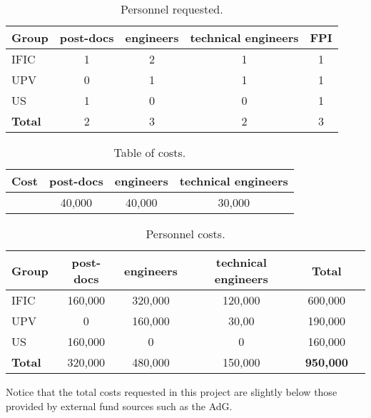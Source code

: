 \begin{table}[h!]
\begin{center}
\begin{tabular}{|l|c|c|c|c|}
\hline
Group &	post-docs	& engineers &	technical engineers & FPI\\
 \hline
IFIC &	1 &	2	&1 &	1\\			
UPV	  & 0	&1 &	1 &	1 \\			
US	& 1 &	0 &	0 &	 1\\			
 \hline
{\bf Total} & 2 & 3 & 2 & 3 \\
 \hline\hline
\end{tabular}  
\caption{Personnel requested.}
\label{tab.P}
\end{center}
\end{table} 

\begin{table}[h!]
\begin{center}
\begin{tabular}{|l|c|c|c|}
\hline
Cost &	post-docs	& engineers &	technical engineers \\
 \hline
 &	40,000 &	40,000	&30,000 \\					
 \hline\hline
\end{tabular}  
\caption{Table of costs.}
\label{tab.new:PT}
\end{center}
\end{table} 

\begin{table}[h!]
\begin{center}
\begin{tabular}{|l|c|c|c|c|c|}
\hline
Group &	post-docs	& engineers &	technical engineers &  Total \\
 \hline
IFIC	&160,000 &	320,000 &	120,000 & 600,000 \\
UPV	 &	0 & 160,000 &	30,00 &	190,000 \\
US	& 160,000 & 0 & 0 &	160,000\\
\hline
{\bf Total} & 320,000 & 480,000 & 150,000 & {\bf 950,000} \\
 \hline\hline
\end{tabular}  
\caption{Personnel costs.}
\label{tab.new:PC}
\end{center}
\end{table} 

Notice that the total costs requested in this project are slightly below those provided by external fund sources such as the AdG. 

